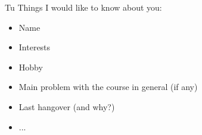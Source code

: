 \begin{frame}{Tu}
    Things I would like to know about you:
    \begin{itemize}
        \item Name
        \item Interests
        \item Hobby
        \item Main problem with the course in general (if any)
        \item Last hangover (and why?)
        \item ...
    \end{itemize}
\end{frame}